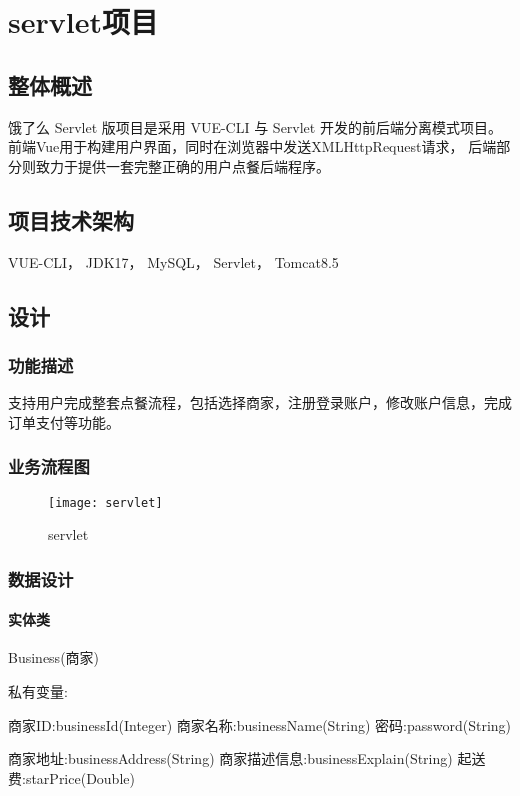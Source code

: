 \chapter{servlet项目}

\section{整体概述}
饿了么 Servlet 版项目是采用 VUE-CLI 与 Servlet 开发的前后端分离模式项目。前端Vue用于构建用户界面，同时在浏览器中发送XMLHttpRequest请求，
后端部分则致力于提供一套完整正确的用户点餐后端程序。

\section{项目技术架构}
VUE-CLI， JDK17， MySQL， Servlet， Tomcat8.5

\section{设计}
\subsection{功能描述}
支持用户完成整套点餐流程，包括选择商家，注册登录账户，修改账户信息，完成订单支付等功能。

\subsection{业务流程图}

\begin{figure}[htbp]
    \centering
    \texttt{[image: servlet]}
    \caption{servlet}
    \vspace{\baselineskip}
\end{figure}

\subsection{数据设计}
\subsubsection{实体类}

Business(商家)

私有变量:

商家ID:businessId(Integer)  商家名称:businessName(String)  密码:password(String)

商家地址:businessAddress(String)  商家描述信息:businessExplain(String)  起送费:starPrice(Double)


